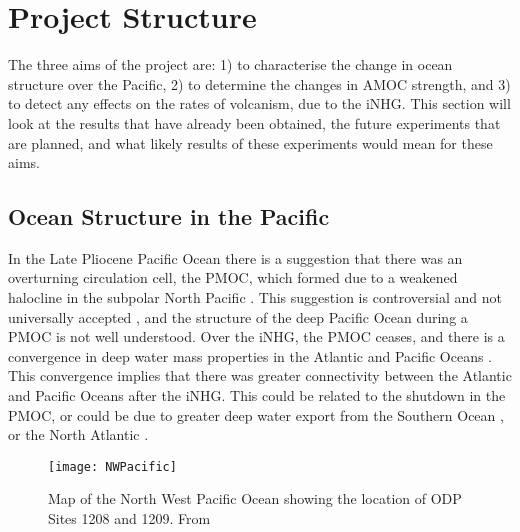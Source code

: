 \section{Project Structure}

The three aims of the project are: 1) to characterise the change in ocean structure over the Pacific, 2) to determine the changes in AMOC strength, and 3) to detect any effects on the rates of volcanism, due to the iNHG. This section will look at the results that have already been obtained, the future experiments that are planned, and what likely results of these experiments would mean for these aims.

\subsection{Ocean Structure in the Pacific}

In the Late Pliocene Pacific Ocean there is a suggestion that there was an overturning circulation cell, the PMOC, which formed due to a weakened halocline in the subpolar North Pacific \citep{burlsActivePacificMeridional2017}. This suggestion is controversial and not universally accepted \citep{zhangMidPlioceneAtlanticMeridional2021}, and the structure of the deep Pacific Ocean during a PMOC is not well understood. Over the iNHG, the PMOC ceases, and there is a convergence in deep water mass properties in the Atlantic and Pacific Oceans \citep{woodardAntarcticRoleNorthern2014}. This convergence implies that there was greater connectivity between the Atlantic and Pacific Oceans after the iNHG. This could be related to the shutdown in the PMOC, or could be due to greater deep water export from the Southern Ocean \citep{hillModelledOceanChanges2017}, or the North Atlantic \citep{kwiekPacificOceanIntermediate1999}. 

\begin{figure}[h]
    \centering
    \texttt{[image: NWPacific]}
    \caption{Map of the North West Pacific Ocean showing the location of ODP Sites 1208 and 1209. From \citet{gebcobathymetriccompilationgroup2021GEBCO2021Grid2021}}
    \label{fig:NWPacific}
\end{figure}

